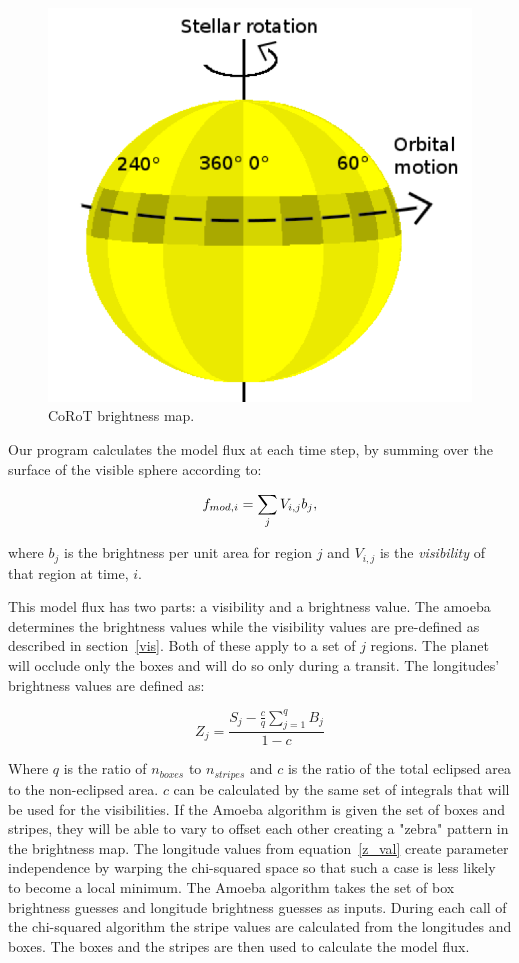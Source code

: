 
\begin{figure}[h]
	\centering
	\includegraphics[width=.5\textwidth]{images/modelGeometry.png}
	\caption{CoRoT brightness map.}
	\label{CoRoT}
\end{figure}


Our program calculates the model flux at each time step, by summing over the surface of the visible sphere according to:

\begin{equation}
	\mbox{$f_{mod,i}$} = \sum_j V_{i,j}b_j, 
\end{equation}

where $b_j$ is the brightness per unit area for region $j$ and $V_{i,j}$ is the {\it visibility} of that region at time, $i$.


This model flux has two parts: a visibility and a brightness value. The amoeba determines the brightness values while the visibility values are pre-defined as described in section~\ref{vis}. Both of these apply to a set of $j$ regions. The planet will occlude only the boxes and will do so only during a transit. The longitudes' brightness values are defined as:

\begin{equation}
Z_j = \frac{S_j - \frac{c}{q} \sum_{j=1}^{q}B_j}{1- c}
\label{z_val}
\end{equation}

Where $q$ is the ratio of $n_{boxes}$ to $n_{stripes}$ and $c$ is the ratio of the total eclipsed area to the non-eclipsed area. $c$ can be calculated by the same set of integrals that will be used for the visibilities. If the Amoeba algorithm is given the set of boxes and stripes, they will be able to vary to offset each other creating a "zebra" pattern in the brightness map.  The longitude values from equation~\ref{z_val} create parameter independence by warping the chi-squared space so that such a case is less likely to become a local minimum. The Amoeba algorithm takes the set of box brightness guesses and longitude brightness guesses as inputs. During each call of the chi-squared algorithm the stripe values are calculated from the longitudes and boxes. The boxes and the stripes are then used to calculate the model flux.

